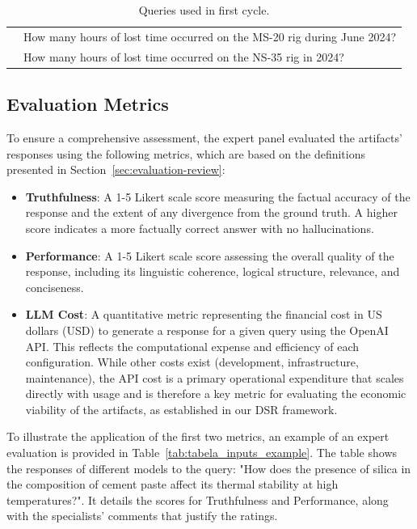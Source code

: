 \begin{table}[h]
\begin{tabular}{|p{.1\linewidth}|p{.9\linewidth}|}
                & How many hours of lost time occurred on the MS-20 rig during June 2024? \\ \cline{2-2}
                & How many hours of lost time occurred on the NS-35 rig in 2024? \\
                \hline
                \end{tabular}
                \fussy
                \caption{Queries used in first cycle. }
                \label{table:question_examples}
            \end{table}

        \subsection{Evaluation Metrics} \label{sec:evaluation_metrics}

            To ensure a comprehensive assessment, the expert panel evaluated the artifacts' responses using the following metrics, which are based on the definitions presented in Section~\ref{sec:evaluation-review}:

            \begin{itemize}

                \item \textbf{Truthfulness}: A 1-5 Likert scale score measuring the factual accuracy of the response and the extent of any divergence from the ground truth. A higher score indicates a more factually correct answer with no hallucinations.

                \item \textbf{Performance}: A 1-5 Likert scale score assessing the overall quality of the response, including its linguistic coherence, logical structure, relevance, and conciseness.

                \item \textbf{LLM Cost}: A quantitative metric representing the financial cost in US dollars (USD) to generate a response for a given query using the OpenAI API. This reflects the computational expense and efficiency of each configuration. While other costs exist (development, infrastructure, maintenance), the API cost is a primary operational expenditure that scales directly with usage and is therefore a key metric for evaluating the economic viability of the artifacts, as established in our DSR framework.
            
            \end{itemize}

            To illustrate the application of the first two metrics, an example of an expert evaluation is provided in Table~\ref{tab:tabela_inputs_example}. The table shows the responses of different models to the query: "How does the presence of silica in the composition of cement paste affect its thermal stability at high temperatures?". It details the scores for Truthfulness and Performance, along with the specialists' comments that justify the ratings.

